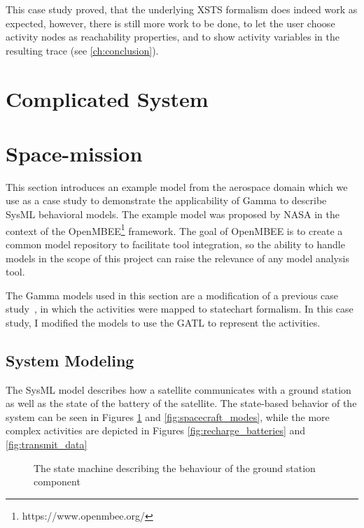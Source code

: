 This case study proved, that the underlying XSTS formalism does indeed work as expected, however, there is still more work to be done, to let the user choose activity nodes as reachability properties, and to show activity variables in the resulting trace (see \autoref{ch:conclusion}).

\section{Complicated System}

\section{Space-mission}

This section introduces an example model from the aerospace domain which we use as a case study to demonstrate the applicability of Gamma to describe SysML behavioral models. The example model was proposed by NASA in the context
of the OpenMBEE\footnote{https://www.openmbee.org/} framework. The goal of OpenMBEE is to create a common model repository to facilitate tool integration, so the ability to handle models in the scope of this project can raise the relevance of any model analysis tool.

The Gamma models used in this section are a modification of a previous case study~\cite{mixed_statecharts_2020}, in which the activities were mapped to statechart formalism. In this case study, I modified the models to use the GATL to represent the activities.

\subsection{System Modeling}

The SysML model describes how a satellite communicates with a ground station as well as the state of the battery of the satellite. The state-based behavior of the system can be seen in Figures \ref{fig:ground_station} and \ref{fig:spacecraft_modes}, while the more complex activities are depicted in Figures \ref{fig:recharge_batteries} and \ref{fig:transmit_data}

\begin{figure}[!ht]
	\centering
	
	\caption{The state machine describing the behaviour of the ground station component}
	\label{fig:ground_station}
\end{figure}

